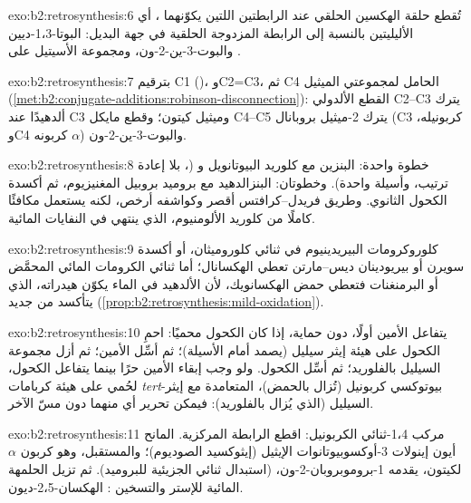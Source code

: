 \begin{solution}{exo:b2:retrosynthesis:6}
تُقطع حلقة الهكسين الحلقي عند الرابطتين  اللتين يكوّنهما ، أي
الأليليتين بالنسبة إلى الرابطة المزدوجة الحلقية في جهة البديل: البوتا-1،3-ديين والبوت-3-ين-2-ون، 
ومجموعة الأسيتيل على .
\end{solution}

\begin{solution}{exo:b2:retrosynthesis:7}
بترقيم C1 ()، وC2=C3، ثم C4 الحامل لمجموعتي الميثيل
(\cref{met:b2:conjugate-additions:robinson-disconnection}): القطع الألدولي C2--C3 يترك ألدهيدًا
عند C3 وميثيل كيتون؛ وقطع مايكل C4--C5 يترك 2-ميثيل بروبانال (C3 كربونيله، وC4 كربونه
$\alpha$) والبوت-3-ين-2-ون.
\end{solution}

\begin{solution}{exo:b2:retrosynthesis:8}
خطوة واحدة: البنزين مع كلوريد البيوتانويل و (، بلا إعادة ترتيب،
وأسيلة واحدة). وخطوتان: البنزالدهيد مع بروميد بروبيل المغنيزيوم، ثم أكسدة الكحول
الثانوي. وطريق فريدل--كرافتس أقصر وكواشفه أرخص، لكنه يستعمل مكافئًا كاملًا من
كلوريد الألومنيوم، الذي ينتهي في النفايات المائية.
\end{solution}

\begin{solution}{exo:b2:retrosynthesis:9}
كلوروكرومات البيريدينيوم في ثنائي كلوروميثان، أو أكسدة سويرن أو بيريودينان ديس--مارتن
تعطي الهكسانال؛ أما ثنائي الكرومات المائي المحمَّض أو البرمنغنات فتعطي حمض الهكسانويك، لأن
الألدهيد في الماء يكوّن هيدراته، الذي يتأكسد من جديد (\cref{prop:b2:retrosynthesis:mild-oxidation}).
\end{solution}

\begin{solution}{exo:b2:retrosynthesis:10}
يتفاعل الأمين أولًا، دون حماية، إذا كان الكحول محميًا: احمِ الكحول على هيئة إيثر سيليل
(يصمد أمام الأسيلة)؛ ثم أسِّل الأمين؛ ثم أزل مجموعة السيليل بالفلوريد؛ ثم أسِّل
الكحول. ولو وجب إبقاء الأمين حرًا بينما يتفاعل الكحول، لحُمي على هيئة كربامات
\textit{tert}-بيوتوكسي كربونيل (تُزال بالحمض)، المتعامدة مع إيثر السيليل (الذي يُزال
بالفلوريد): فيمكن تحرير أي منهما دون مسّ الآخر.
\end{solution}

\begin{solution}{exo:b2:retrosynthesis:11}
 مركب 1،4-ثنائي الكربونيل: اقطع الرابطة  المركزية. المانح أيون إينولات
3-أوكسوبيوتانوات الإيثيل (إيثوكسيد الصوديوم)؛ والمستقبل، وهو كربون $\alpha$ لكيتون، يقدمه
1-بروموبروبان-2-ون،  (استبدال ثنائي الجزيئية للبروميد). ثم تزيل الحلمهة المائية
للإستر والتسخين : الهكسان-2،5-ديون.
\end{solution}

